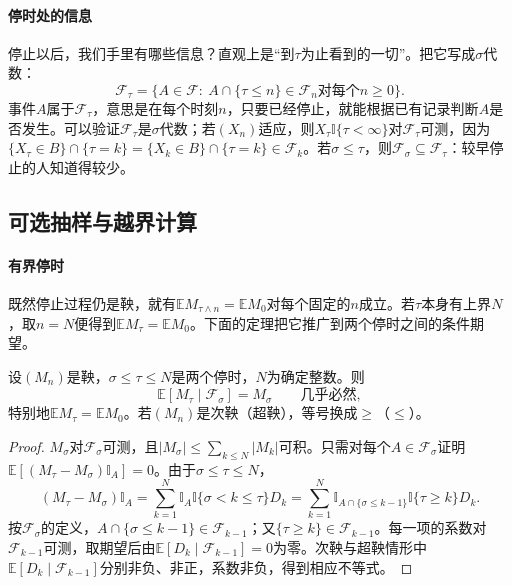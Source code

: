 \paragraph{停时处的信息}
停止以后，我们手里有哪些信息？直观上是“到$\tau$为止看到的一切”。把它写成$\sigma$代数：
\[
  \mathcal F_\tau=\{A\in\mathcal F:\ A\cap\{\tau\leq n\}\in\mathcal F_n\text{对每个}n\geq0\}.
\]
事件$A$属于$\mathcal F_\tau$，意思是在每个时刻$n$，只要已经停止，就能根据已有记录判断$A$是否发生。可以验证$\mathcal F_\tau$是$\sigma$代数；若$(X_n)$适应，则$X_\tau\mathbb I\{\tau<\infty\}$对$\mathcal F_\tau$可测，因为$\{X_\tau\in B\}\cap\{\tau=k\}=\{X_k\in B\}\cap\{\tau=k\}\in\mathcal F_k$。若$\sigma\leq\tau$，则$\mathcal F_\sigma\subseteq\mathcal F_\tau$：较早停止的人知道得较少。

\subsection{可选抽样与越界计算}
\label{sec:dtsp-optional-sampling}

\paragraph{有界停时}
既然停止过程仍是鞅，就有$\mathbb EM_{\tau\wedge n}=\mathbb EM_0$对每个固定的$n$成立。若$\tau$本身有上界$N$，取$n=N$便得到$\mathbb EM_\tau=\mathbb EM_0$。下面的定理把它推广到两个停时之间的条件期望。

\begin{theorem}[有界停时的可选抽样]
  \label{thm:dtsp-bounded-optional-sampling}
  设$(M_n)$是鞅，$\sigma\leq\tau\leq N$是两个停时，$N$为确定整数。则
  \[
    \mathbb E[M_\tau\mid\mathcal F_\sigma]=M_\sigma\qquad\text{几乎必然},
  \]
  特别地$\mathbb EM_\tau=\mathbb EM_0$。若$(M_n)$是次鞅（超鞅），等号换成$\geq$（$\leq$）。
\end{theorem}

\begin{proof}
$M_\sigma$对$\mathcal F_\sigma$可测，且$|M_\sigma|\leq\sum_{k\leq N}|M_k|$可积。只需对每个$A\in\mathcal F_\sigma$证明$\mathbb E[(M_\tau-M_\sigma)\mathbb I_A]=0$。由于$\sigma\leq\tau\leq N$，
\[
  (M_\tau-M_\sigma)\mathbb I_A=\sum_{k=1}^N\mathbb I_A\mathbb I\{\sigma<k\leq\tau\}D_k
  =\sum_{k=1}^N\mathbb I_{A\cap\{\sigma\leq k-1\}}\mathbb I\{\tau\geq k\}D_k.
\]
按$\mathcal F_\sigma$的定义，$A\cap\{\sigma\leq k-1\}\in\mathcal F_{k-1}$；又$\{\tau\geq k\}\in\mathcal F_{k-1}$。每一项的系数对$\mathcal F_{k-1}$可测，取期望后由$\mathbb E[D_k\mid\mathcal F_{k-1}]=0$为零。次鞅与超鞅情形中$\mathbb E[D_k\mid\mathcal F_{k-1}]$分别非负、非正，系数非负，得到相应不等式。
\end{proof}

